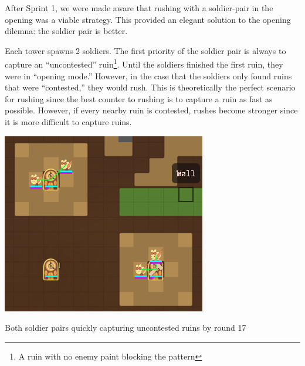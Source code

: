 \medskip

After Sprint 1, we were made aware that rushing with a soldier-pair in the opening was a viable strategy. This provided an elegant solution to the opening dilemna: the soldier pair is better.

\medskip

Each tower spawns 2 soldiers. The first priority of the soldier pair is always to capture an ``uncontested'' ruin\footnote{A ruin with no enemy paint blocking the pattern}. Until the soldiers finished the first ruin, they were in ``opening mode.'' However, in the case that the soldiers only found ruins that were ``contested,'' they would rush. This is theoretically the perfect scenario for rushing since the best counter to rushing is to capture a ruin as fast as possible. However, if every nearby ruin is contested, rushes become stronger since it is more difficult to capture ruins.
\begin{center}
  \includegraphics[scale=0.1]{images/round_17_capture.png}
  \caption{Both soldier pairs quickly capturing uncontested ruins by round 17}
\end{center}

